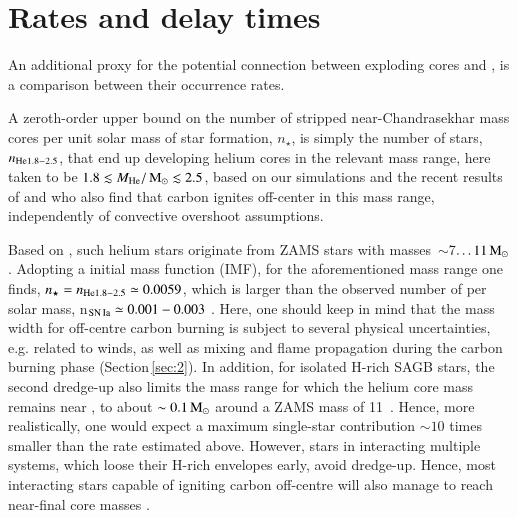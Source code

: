 \documentclass[twocolumn]{aa}
\begin{document}
\section{Rates and delay times}\label{sec:4}
An additional  proxy for the potential connection between exploding \one cores and \ias, is a comparison between their  occurrence rates. 

A zeroth-order upper bound on the number of stripped near-Chandrasekhar mass \one cores per unit solar mass of star formation, $n_\star$, is 
simply the number of stars, $n_{\rm{He}1.8-2.5}$, that end up developing  helium cores in the relevant mass range, here taken to be $1.8\lesssim M_{\rm{He}}/\mathrm{\,M_\odot} \lesssim 2.5$, based on our simulations and the recent results of \cite{Woosley:2019sdf} and \cite{Farmer:2015afs} who also find that carbon ignites off-center in this mass range, independently of convective overshoot assumptions.

 Based on 
\cite{Farmer:2015afs},  such helium stars originate from ZAMS stars with masses~$\sim$7$\ldots 11\mathrm{\,M_\odot}$. Adopting a \cite{Chabrier:2004vw} initial mass function (IMF), for the aforementioned mass range one  finds,  $n_\star=n_{\rm{He}1.8-2.5}\simeq 0.0059$, which is larger than the observed number of \ias per solar mass, n$_{\rm SN\,Ia}\simeq 0.001-0.003$ \citep[e.g.][]{claeys2014a,Maoz:2013hna}. 
Here, one should keep in mind that the mass width for off-centre carbon burning is subject to several  physical uncertainties, e.g. 
related to winds, as well as mixing and flame propagation during the carbon burning phase (Section\,\ref{sec:2}). In addition, for isolated 
H-rich SAGB stars, the second  dredge-up also limits the mass range 
for which the helium core mass remains near \mch, to about $\sim0.1\mathrm{\,M_\odot}$ around a ZAMS mass of 11\msun\ \citep[c.f. Figure\,1 in][]{Podsiadlowski:2003py}. Hence, more realistically, one would expect a maximum single-star contribution $\sim10$ times smaller than the rate estimated above. However, stars in interacting multiple systems, which loose their 
H-rich envelopes early, avoid dredge-up. Hence, most interacting stars capable of igniting carbon off-centre will also 
manage to reach near-\mch final core masses \citep[][and references therein]{Podsiadlowski:2003py,poelarends2007,Poelarends:2007ip,chen2014b,Meng:2014qta,doherty2015,Poelarends:2017dua}.
\end{document}

